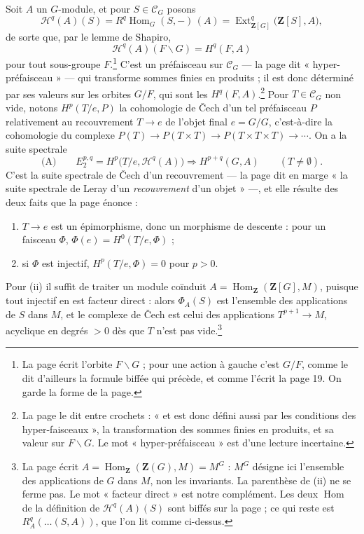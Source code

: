 \documentclass[11pt,a4paper]{article}
\begin{document}
Soit $A$ un $G$-module, et pour $S \in \mathcal{C}_G$ posons
\[
  \mathcal{H}^{q}(A)(S) = R^{q}\operatorname{Hom}_G(S, -)\,(A)
  = \operatorname{Ext}^{q}_{\mathbf{Z}[G]}\bigl(\mathbf{Z}[S], A\bigr),
\]
de sorte que, par le lemme de Shapiro,
\[
  \mathcal{H}^{q}(A)(F \backslash G) = H^{q}(F, A)
\]
pour tout sous-groupe $F$.\footnote{La page écrit l'orbite $F \backslash G$ ;
pour une action à gauche c'est $G/F$, comme le dit d'ailleurs la formule
biffée qui précède, et comme l'écrit la page 19. On garde la forme de la
page.} C'est un préfaisceau sur $\mathcal{C}_G$ --- la page dit
« hyper-préfaisceau » --- qui transforme sommes finies en produits ; il est
donc déterminé par ses valeurs sur les orbites $G/F$, qui sont les
$H^{q}(F, A)$.\footnote{La page le dit entre crochets : « et est donc
défini aussi par les conditions des hyper-faisceaux », la transformation
des sommes finies en produits, et sa valeur sur $F \backslash G$. Le mot
« hyper-préfaisceau » est d'une lecture incertaine.} Pour $T \in \mathcal{C}_G$ non vide, notons
$H^{p}(T/e, P)$ la cohomologie de Čech d'un tel préfaisceau $P$ relativement
au recouvrement $T \to e$ de l'objet final $e = G/G$, c'est-à-dire la
cohomologie du complexe
$P(T) \to P(T \times T) \to P(T \times T \times T) \to \cdots$. On a la suite
spectrale
\[
  \text{(A)}\qquad
  E_2^{p,q} = H^{p}\bigl(T/e, \mathcal{H}^{q}(A)\bigr) \Longrightarrow
  H^{p+q}(G, A) \qquad (T \neq \emptyset).
\]
C'est la suite spectrale de Čech d'un recouvrement --- la page dit en marge
« la suite spectrale de Leray d'un \emph{recouvrement} d'un objet » ---, et
elle résulte des deux faits que la page énonce :
\begin{enumerate}
\item[(i)] $T \to e$ est un épimorphisme, donc un morphisme de descente :
pour un faisceau $\Phi$, $\Phi(e) = H^{0}(T/e, \Phi)$ ;
\item[(ii)] si $\Phi$ est injectif, $H^{p}(T/e, \Phi) = 0$ pour $p > 0$.
\end{enumerate}
Pour (ii) il suffit de traiter un module coïnduit
$A = \operatorname{Hom}_{\mathbf{Z}}(\mathbf{Z}[G], M)$, puisque tout
injectif en est facteur direct : alors $\Phi_A(S)$ est l'ensemble des
applications de $S$ dans $M$, et le complexe de Čech est celui des
applications $T^{p+1} \to M$, acyclique en degrés $> 0$ dès que $T$ n'est pas
vide.\footnote{La page écrit
$A = \operatorname{Hom}_{\mathbf{Z}}(\mathbf{Z}(G), M) = M^{G}$ : $M^{G}$
désigne ici l'ensemble des applications de $G$ dans $M$, non les invariants.
La parenthèse de (ii) ne se ferme pas. Le mot « facteur direct » est notre
complément. Les deux $\operatorname{Hom}$ de la définition de
$\mathcal{H}^{q}(A)(S)$ sont biffés sur la page ; ce qui reste est
$R^{q}_{A}(\ldots(S, A))$, que l'on lit comme ci-dessus.}
\end{document}
